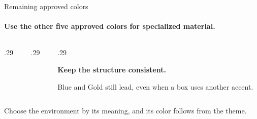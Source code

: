 \begin{frame}{Remaining approved colors}
  \framesubtitle{Use the other five approved colors for specialized material.}
  \begin{columns}[T,onlytextwidth]
    \begin{column}{.29\textwidth}
    \end{column}
    \begin{column}{.29\textwidth}
    \end{column}
    \begin{column}{.29\textwidth}
      \vspace{.15cm}
      {\small\bfseries\color{wvu-blue}Keep the structure consistent.\par}
      \smallskip
      {\small Blue and Gold still lead, even when a box uses another accent.}
    \end{column}
  \end{columns}
  \vspace{.20cm}
  {\small Choose the environment by its meaning, and its color follows from the theme.}
\end{frame}
